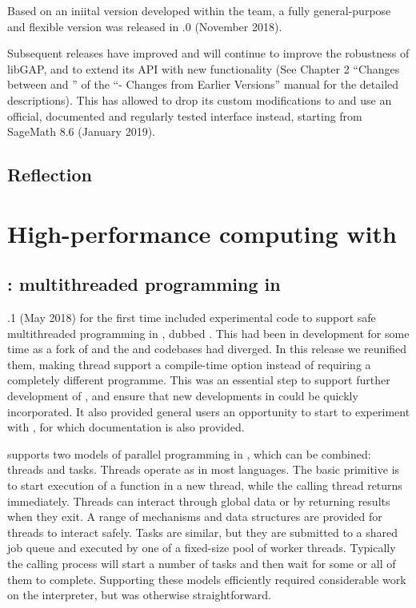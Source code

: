 \documentclass{deliverablereport}
\begin{document}
Based on an iniital version developed within the \Sage team, a fully
general-purpose and flexible version was released in .0
(November 2018).

Subsequent releases have improved and will continue to improve the
robustness of libGAP, and to extend its API with new functionality (See Chapter 2 
``Changes between  and '' of the 
``\GAP - Changes from Earlier Versions'' manual for the detailed
descriptions). This has allowed \Sage to drop its custom 
modifications to \GAP and use an official, documented and regularly 
tested \GAP interface instead, starting from SageMath 8.6 (January
2019).


\subsection{Reflection}\label{syntaxtree}

\section{High-performance computing with \GAP}\label{hpc}

\subsection{\HPCGAP: multithreaded programming in \GAP}\label{hpc-gap}

.1 (May 2018) for the first time included experimental code to 
support safe multithreaded programming in \GAP, dubbed \HPCGAP. This
had been in development for some time as a fork of \GAP and the \HPCGAP and \GAP
codebases had diverged. In this release we reunified them,
making thread support a compile-time option instead of requiring a completely
different programme. This was an essential step to support further development of 
\HPCGAP, and ensure that new developments in \GAP could be quickly
incorporated. It also provided general \GAP users an opportunity to start to experiment 
with \HPCGAP, for which documentation is also provided.


\HPCGAP supports two models of parallel programming in \GAP, which can
be combined: threads and tasks. Threads operate as in most languages.
The basic primitive is to start execution of a \GAP function in a new
thread, while the calling thread returns immediately. Threads can
interact through global data or by returning results when they exit. A
range of mechanisms and data structures are provided for threads to
interact safely. Tasks are
similar, but they are submitted to a shared job queue and executed by
one of a fixed-size pool of worker threads. Typically the calling
process will start a number of tasks and then wait for some or all
of them to complete.  Supporting these models efficiently required considerable work on
the \GAP interpreter, but was otherwise straightforward.
\end{document}
